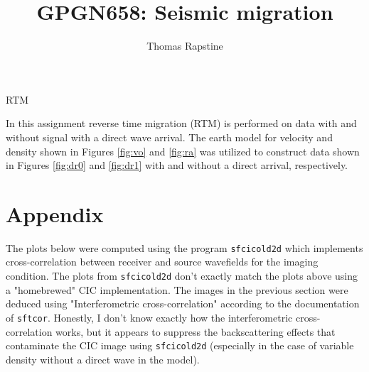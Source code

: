 \author{Thomas Rapstine}
\title{GPGN658: Seismic migration}{RTM}




In this assignment reverse time migration (RTM) is performed on data with and without signal with a direct wave arrival.  The earth model for velocity and density shown in Figures \ref{fig:vo} and  \ref{fig:ra} was utilized to construct data shown in Figures \ref{fig:dr0} and \ref{fig:dr1} with and without a direct arrival, respectively.




\section{Appendix}
The plots below were computed using the program \texttt{sfcicold2d} which implements cross-correlation between receiver and source wavefields for the imaging condition.  The plots from \texttt{sfcicold2d} don't exactly match the plots above using a "homebrewed" CIC implementation.  The images in the previous section were deduced using "Interferometric cross-correlation" according to the documentation of \texttt{sftcor}.  Honestly, I don't know exactly how the interferometric cross-correlation works, but it appears to suppress the backscattering effects that contaminate the CIC image using \texttt{sfcicold2d} (especially in the case of variable density without a direct wave in the model). 

